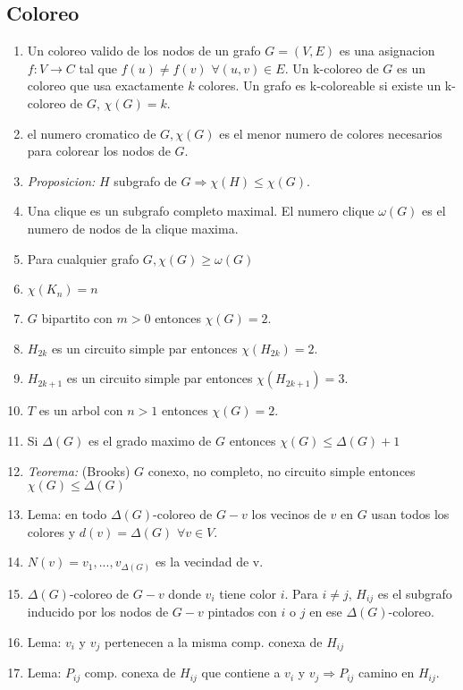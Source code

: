 \documentclass[a4paper, 11pt]{article}
\begin{document}
\subsection{Coloreo}
\begin{enumerate}
\item Un coloreo valido de los nodos de un grafo $G=(V,E)$ es una asignacion $f:V\rightarrow C$ tal que $f(u) \neq f(v)$ $\forall(u,v)\in E$. Un k-coloreo de $G$ es un coloreo que usa exactamente $k$ colores. Un grafo es k-coloreable si existe un k-coloreo de $G$, $\chi(G)=k$.
\item el numero cromatico de $G, \chi(G)$ es el menor numero de colores necesarios para colorear los nodos de $G$.
\item \textit{Proposicion:} $H$ subgrafo de $G \Rightarrow \chi(H) \leq \chi(G)$.
\item Una clique es un subgrafo completo maximal. El numero clique $\omega(G)$ es el numero de nodos de la clique maxima.
\item Para cualquier grafo $G, \chi(G) \geq \omega(G)$
\item $\chi(K_{n}) = n$
\item $G$ bipartito con $m>0$ entonces $\chi(G) = 2$.
\item $H_{2k}$ es un circuito simple par entonces $\chi(H_{2k}) = 2$.
\item $H_{2k+1}$ es un circuito simple par entonces $\chi(H_{2k+1}) = 3$.
\item $T$ es un arbol con $n>1$ entonces $\chi(G) = 2$.
\item Si $\Delta(G)$ es el grado maximo de $G$ entonces $\chi(G) \leq \Delta(G)+1$
\item \textit{Teorema:} (Brooks) $G$ conexo, no completo, no circuito simple entonces $\chi(G) \leq \Delta(G)$
\item Lema: en todo $\Delta(G)$-coloreo de $G-{v}$ los vecinos de $v$ en $G$ usan todos los colores y $d(v) = \Delta(G)$ $\forall v \in V$.
\item $N(v)={v_{1},...,v_{\Delta(G)}}$ es la vecindad de v.
\item $\Delta(G)$-coloreo de $G-{v}$ donde $v_{i}$ tiene color $i$. Para $i \neq j$, $H_{ij}$ es el subgrafo inducido por los nodos de $G-{v}$ pintados con $i$ o $j$ en ese $\Delta(G)$-coloreo.
\item Lema: $v_{i}$ y $v_{j}$ pertenecen a la misma comp. conexa de $H_{ij}$
\item Lema: $P_{ij}$ comp. conexa de $H_{ij}$ que contiene a $v_{i}$ y $v_{j} \Rightarrow P_{ij}$ camino en $H_{ij}$.

\end{enumerate}
\end{document}
